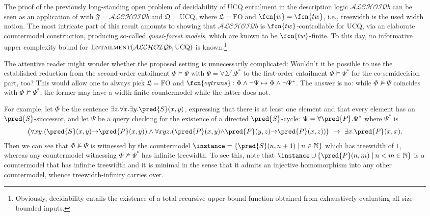 \begin{example}\label{ex:ALCHOIQb}
	The proof of the previously long-standing open problem of decidability of UCQ entailment in the description logic $\mathcal{ALCHOIQ}b$ \cite{RudolphG10} can be seen as an application of  with $\mathfrak{F} = \mathcal{ALCHOIQ}b$ and $\mathfrak{Q} = \mathrm{UCQ}$, where $\mathfrak{L} = \mathrm{FO}$ and $\fcn{w} = \fcn{tw}$, i.e., treewidth is the used width notion. The most intricate part of this result amounts to showing that $\mathcal{ALCHOIQ}b$ is $\fcn{tw}$-controllable for $\mathrm{UCQ}$, via an elaborate countermodel construction\remarkstart, producing so-called \emph{quasi-forest models}, which are known to be $\fcn{tw}$-finite. \color{black} To this day, no informative upper complexity bound for $\textsc{Entailment}(\mathcal{ALCHOIQ}b,\mathrm{UCQ})$ is known.\footnote{Obviously, decidability entails the existence of a total recursive upper-bound function obtained from exhaustively evaluating all size-bounded inputs.}
\end{example}

\begin{remark}
The attentive reader might wonder whether the proposed setting is unnecessarily complicated: Wouldn't it be possible to use the established reduction from the second-order entailment $\Phi \models \Psi$ with $\Psi = \forall\Sigma'.\Psi^*$ to the first-order entailment $\Phi \models \Psi^*$ for the co-semidecision part, too? This would allow one to always pick $\mathfrak{L} = \mathrm{FO}$ and $\fcn{eqtrans} : \Phi \wedge \neg \Psi \mapsto \Phi \wedge \neg \Psi^*$. The answer is no:
while $\Phi \not\models \Psi$ coincides with $\Phi \not\models \Psi^*$, the former may have a width-finite countermodel while the latter does not.

For example, let $\Phi$ be the sentence $\exists z.\forall x.\exists y.\pred{S}(x,y)$, expressing that there is at least one element and that every element has an $\pred{S}$-successor, and 
let $\Psi$ be a query checking for the existence of a directed $\pred{S}$-cycle: $\Psi = \forall \pred{P}.\Psi^*$ where
$\Psi^*$ is 
$$
\begin{array}{@{}c@{}}
\big(\forall xy.(\pred{S}(x,y){\to} \pred{P}(x,y)) \wedge \forall xyz.(\pred{P}(x,y) {\wedge} \pred{P}(y,z) {\to} \pred{P}(x,z))\big)
\  \to  \  \exists x.\pred{P}(x,x).
\end{array}
$$
Then we can see that $\Phi \not\models \Psi$ is witnessed by the countermodel $\instance = \{\pred{S}(n,n+1) \mid n \in \mathbb{N}\}$ which has treewidth of $1$, whereas any countermodel witnessing 
$\Phi \not\models \Psi^*$ has infinite treewidth. To see this, note that $\instance \cup \{\pred{P}(n,m) \mid n < m \in \mathbb{N}\}$ is a countermodel that has infinite treewidth and it is minimal in the sense that it admits an injective homomorphism into any other countermodel, whence treewidth-infinity carries over.
\end{remark}

